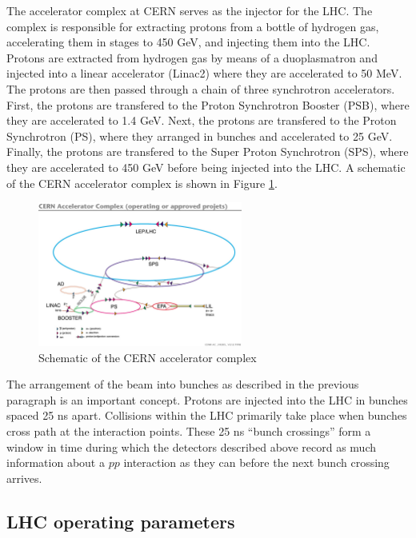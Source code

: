 The accelerator complex at CERN serves as the injector for the LHC.
The complex is responsible for extracting protons from a bottle
of hydrogen gas, accelerating them in stages to 450 GeV, and injecting them into the LHC.
Protons are extracted from hydrogen gas by means of a duoplasmatron and 
injected into a linear accelerator (Linac2) where they are accelerated to 50 MeV.
The protons are then passed through a chain of three synchrotron accelerators.
First, the protons are transfered to the Proton Synchrotron Booster (PSB),
 where they are accelerated to 
1.4 GeV.  Next, the protons are transfered to the Proton Synchrotron (PS),
 where they arranged in bunches and accelerated
to 25 GeV.  Finally, the protons are transfered to the Super Proton Synchrotron (SPS),
 where they are accelerated to 450 GeV
before being injected into the LHC. A schematic of the CERN accelerator complex is 
shown in Figure \ref{fig:lhc-complex}.
\begin{figure}
  \centering
  \includegraphics[width=0.6\textwidth]{tex/lhc/fig/lhc-injector-complex.jpg}
  \caption{ Schematic of the CERN accelerator complex \cite{lhc-complex}}
  \label{fig:lhc-complex}
\end{figure}

The arrangement of the beam into bunches as described in the previous 
paragraph is an important concept.  Protons are injected into the LHC 
in bunches spaced 25 ns apart.  Collisions within the LHC primarily
take place when bunches cross path at the interaction points.  These
25 ns ``bunch crossings'' form a window in time during which the detectors
described above record as much information about a $pp$ interaction as they can
before the next bunch crossing arrives.

\subsection{LHC operating parameters}
\label{sec:lhc-parameters}

